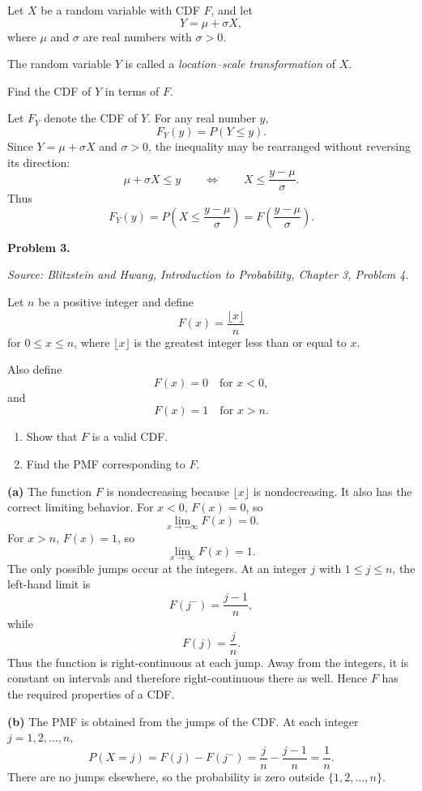 \documentclass[11pt]{article}
\newcommand{\source}[1]{%
    \vspace{0.15cm}
    {\small\textit{Source: Blitzstein and Hwang, \textit{Introduction to Probability}, Chapter 3, Problem #1.}}
}
\begin{document}
Let $X$ be a random variable with CDF $F$, and let
\[
Y=\mu+\sigma X,
\]
where $\mu$ and $\sigma$ are real numbers with $\sigma>0$.

The random variable $Y$ is called a \emph{location--scale transformation} of $X$.

Find the CDF of $Y$ in terms of $F$.

\begin{solutionbox}
Let $F_Y$ denote the CDF of $Y$. For any real number $y$,
\[
F_Y(y)=P(Y\le y).
\]
Since $Y=\mu+\sigma X$ and $\sigma>0$, the inequality may be rearranged without reversing its direction:
\[
\mu+\sigma X\le y
\qquad \Longleftrightarrow \qquad
X\le \frac{y-\mu}{\sigma}.
\]
Thus
\[
F_Y(y)
=
P\left(X\le \frac{y-\mu}{\sigma}\right)
=
F\left(\frac{y-\mu}{\sigma}\right).
\]
 
\end{solutionbox}
\newpage


\begin{problemheader}
\textbf{Problem 3.}
\end{problemheader}
\source{4}

Let $n$ be a positive integer and define
\[
F(x)=\frac{\lfloor x\rfloor}{n}
\]
for $0\le x\le n$, where $\lfloor x\rfloor$ is the greatest integer less than or equal to $x$.

Also define
\[
F(x)=0 \quad \text{for } x<0,
\]
and
\[
F(x)=1 \quad \text{for } x>n.
\]

\begin{enumerate}[label=(\alph*), leftmargin=*]
    \item Show that $F$ is a valid CDF.

    \item Find the PMF corresponding to $F$.
\end{enumerate}

\begin{solutionbox}
\textbf{(a)} The function $F$ is nondecreasing because $\lfloor x\rfloor$ is nondecreasing. It also has the correct limiting behavior. For $x<0$, $F(x)=0$, so
\[
\lim_{x\to -\infty}F(x)=0.
\]
For $x>n$, $F(x)=1$, so
\[
\lim_{x\to \infty}F(x)=1.
\]
The only possible jumps occur at the integers. At an integer $j$ with $1\le j\le n$, the left-hand limit is
\[
F(j^-)=\frac{j-1}{n},
\]
while
\[
F(j)=\frac{j}{n}.
\]
Thus the function is right-continuous at each jump. Away from the integers, it is constant on intervals and therefore right-continuous there as well. Hence $F$ has the required properties of a CDF.
 

\textbf{(b)} The PMF is obtained from the jumps of the CDF. At each integer $j=1,2,\ldots,n$,
\[
P(X=j)=F(j)-F(j^-)=\frac{j}{n}-\frac{j-1}{n}=\frac{1}{n}.
\]
There are no jumps elsewhere, so the probability is zero outside $\{1,2,\ldots,n\}$.
 
\end{solutionbox}
\newpage
\end{document}
